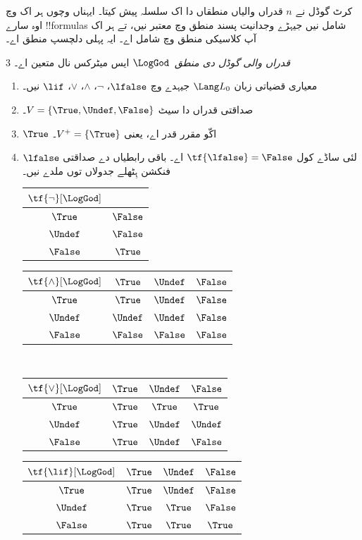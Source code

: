 \documentclass[../../../include/open-logic-section]{subfiles}
\begin{document}


کرٹ گوڈل نے $n$ قدراں والیاں منطقاں دا اک سلسلہ پیش کیتا۔
ایہناں وچوں ہر اک وچ اوہ سارے !!{formula}s شامل نیں جیہڑے
وجدانیت پسند منطق وچ معتبر نیں، تے ہر اک آپ کلاسیکی منطق وچ
شامل اے۔ ایہ پہلی دلچسپ منطق اے۔

\begin{defn}
\emph{$3$ قدراں والی گوڈل دی منطق}~$\LogGod$ ایس میٹرکس نال متعین اے۔
\begin{enumerate}
  \item معیاری قضیاتی زبان $\Lang L_0$ جیہدے وچ
  $\lfalse$، $\lnot$، $\land$، $\lor$، $\lif$ نیں۔
  \item صداقتی قدراں دا سیٹ $V = \{\True, \Undef, \False\}$۔
  \item $\True$ اکّو مقرر قدر اے، یعنی $V^+ = \{\True\}$۔
  \item $\lfalse$ لئی ساڈے کول $\tf{\lfalse} = \False$ اے۔
  باقی رابطیاں دے صداقتی فنکشن ہِٹھلے جدولاں توں ملدے نیں۔
  \begin{center}
    \begin{tabular}{c|c} 
      $\tf{\lnot}[\LogGod]$ & \\ 
      \hline  
      $\True$ & $\False$ \\ 
      $\Undef$ & $\False$ \\
      $\False$ & $\True$ 
    \end{tabular}
    \quad
    \begin{tabular}{c|ccc} 
      $\tf{\land}[\LogGod]$ & $\True$ & $\Undef$ & $\False$ \\ 
      \hline 
      $\True$ & $\True$ & $\Undef$ & $\False$ \\ 
      $\Undef$ & $\Undef$ & $\Undef$ & $\False$\\ 
      $\False$ & $\False$ & $\False$ & $\False$ 
    \end{tabular}
    \\[2ex]
    \begin{tabular}{c|ccc} 
      $\tf{\lor}[\LogGod]$ & $\True$ & $\Undef$ & $\False$ \\ 
      \hline 
      $\True$ & $\True$ & $\True$ & $\True$ \\ 
      $\Undef$ & $\True$ & $\Undef$ & $\Undef$ \\
      $\False$ & $\True$ & $\Undef$ & $\False$ 
    \end{tabular}
    \quad
    \begin{tabular}{c|ccc} 
      $\tf{\lif}[\LogGod]$ & $\True$ & $\Undef$ & $\False$ \\ 
      \hline 
      $\True$ & $\True$ & $\Undef$ & $\False$ \\ 
      $\Undef$ & $\True$ & $\True$ & $\False$  \\ 
      $\False$ & $\True$ & $\True$ & $\True$ 
    \end{tabular}
  \end{center}
\end{enumerate}
\end{defn}
\end{document}
